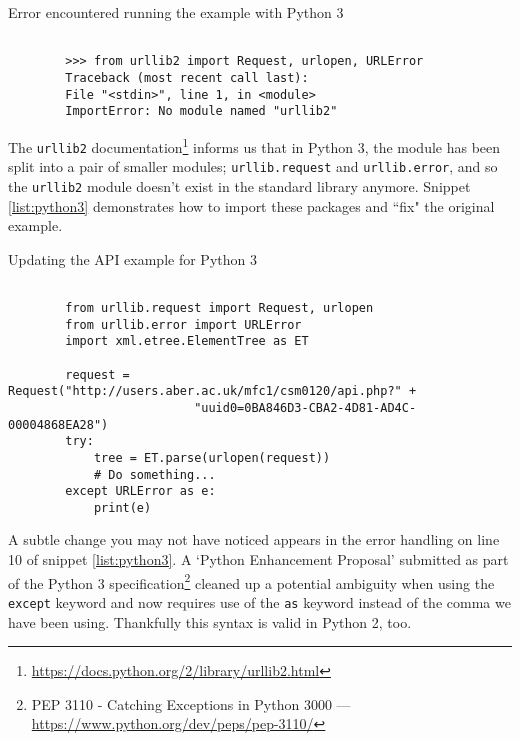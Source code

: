 \documentclass[a4paper]{article}
\begin{document}
\begin{listing}[H]
    \caption[]{Error encountered running the example with Python 3}
    \label{list:err1}
    \begin{verbatim}

        >>> from urllib2 import Request, urlopen, URLError
        Traceback (most recent call last):
        File "<stdin>", line 1, in <module>
        ImportError: No module named "urllib2"

    \end{verbatim}
\end{listing}

The \texttt{urllib2} documentation\footnote{{\href{https://docs.python.org/2/library/urllib2.html}{https://docs.python.org/2/library/urllib2.html}}} informs us that in Python 3, the module has been split into a
pair of smaller modules; \texttt{urllib.request} and \texttt{urllib.error}, and so
the \texttt{urllib2} module doesn't exist in the standard library anymore.
Snippet \ref{list:python3} demonstrates how to import these packages and ``fix"
the original example.

\begin{listing}[H]
    \caption[]{Updating the API example for Python 3}
    \label{list:python3}
    \begin{verbatim}

        from urllib.request import Request, urlopen
        from urllib.error import URLError
        import xml.etree.ElementTree as ET

        request = Request("http://users.aber.ac.uk/mfc1/csm0120/api.php?" +
                          "uuid0=0BA846D3-CBA2-4D81-AD4C-00004868EA28")
        try:
            tree = ET.parse(urlopen(request))
            # Do something...
        except URLError as e:
            print(e)

    \end{verbatim}
\end{listing}


A subtle change you may not have noticed appears in the error handling on line
10 of snippet \ref{list:python3}. A `Python Enhancement Proposal' submitted as part of
the Python 3 specification\footnote{PEP 3110 - Catching Exceptions in Python 3000 --- {\href{https://www.python.org/dev/peps/pep-3110/}{https://www.python.org/dev/peps/pep-3110/}}}  cleaned up a potential ambiguity
when using the \texttt{except} keyword and now requires use of the \texttt{as}
keyword instead of the comma we have been using. Thankfully this syntax is valid in
Python 2, too.
\end{document}

